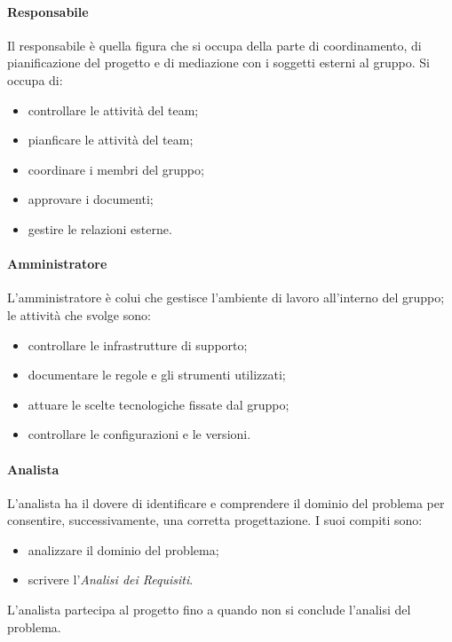 \paragraph{Responsabile} \hfill \break
Il responsabile è quella figura che si occupa della parte di coordinamento, di pianificazione del progetto 
e di mediazione con i soggetti esterni al gruppo. Si occupa di:
\begin{itemize}
    \item controllare le attività del team;
    \item pianficare le attività del team;
    \item coordinare i membri del gruppo;
    \item approvare i documenti;
    \item gestire le relazioni esterne.
\end{itemize}

\paragraph{Amministratore} \hfill \break
L'amministratore è colui che gestisce l'ambiente di lavoro all'interno del gruppo; le attività che svolge sono:
\begin{itemize}
    \item controllare le infrastrutture di supporto;
    \item documentare le regole e gli strumenti utilizzati;
    \item attuare le scelte tecnologiche fissate dal gruppo;
    \item controllare le configurazioni e le versioni.
\end{itemize}

\paragraph{Analista} \hfill \break
L'analista ha il dovere di identificare e comprendere il dominio del problema per consentire, successivamente,
una corretta progettazione. I suoi compiti sono:
\begin{itemize}
    \item analizzare il dominio del problema;
    \item scrivere l'\emph{Analisi dei Requisiti}.
\end{itemize}
L'analista partecipa al progetto fino a quando non si conclude l'analisi del problema.

